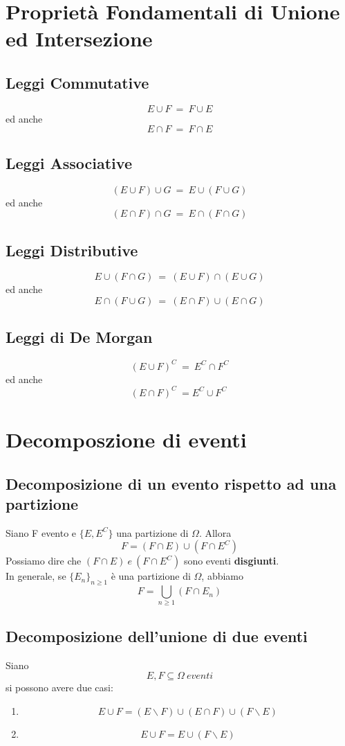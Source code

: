 \documentclass{report}
\begin{document}
\section{Proprietà Fondamentali di Unione ed Intersezione}
\subsection{Leggi Commutative}
\[E \cup F\ =\ F \cup E\] ed anche \[E \cap F\ =\ F \cap E\]
\subsection{Leggi Associative}
\[(E \cup F) \cup G\ =\ E \cup (F \cup G)\] ed anche \[(E \cap F)\cap G\ =\ E \cap (F \cap G)\]
\subsection{Leggi Distributive}
\[E \cup (F \cap G)\ =\ (E \cup F)\cap (E \cup G)\] ed anche \[E \cap (F \cup G)\ =\ (E \cap F)\cup (E \cap G)\]
\subsection{Leggi di De Morgan}
\[(E \cup F)^C\ =\ E^C \cap F^C\] ed anche \[(E \cap F)^C\ = E^C \cup F^C\ \]
\section{Decomposzione di eventi}
\subsection{Decomposizione di un evento rispetto ad una partizione}
Siano F evento e \(\{E, E^C\}\) una partizione di \(\Omega\). Allora \[F = (F \cap E) \cup (F\cap E^C)\] Possiamo dire che \((F \cap E)\ e\ (F\cap E^C)\) sono eventi \textbf{disgiunti}.\\
In generale, se \(\{E_n\}_{n\geq 1}\) è una partizione di \(\Omega\), abbiamo \[F = \bigcup_{n\geq 1} (F \cap E_n)\]
\subsection{Decomposizione dell'unione di due eventi}
Siano \[E,F \subseteq \Omega\ eventi\] si possono avere due casi:\begin{enumerate}
    \item \[E \cup F = (E \backslash F)\cup (E \cap F)\cup (F\backslash E)\]
    \item \[E \cup F = E \cup (F \backslash E)\]
\end{enumerate}
\end{document}
